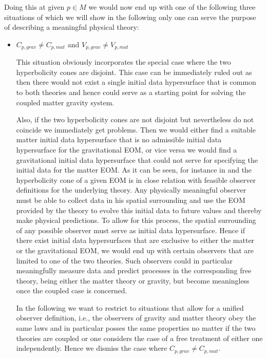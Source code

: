Doing this at given $p \in M$ we would now end up with one of the following three situations of which we will show in the following only one can serve the purpose of describing a meaningful physical theory:
\begin{itemize}
    \item $C_{p,grav} \neq C_{p,mat}$ and $V_{p,grav} \neq V_{p,mat}$
    
This situation obviously incorporates the special case where the two hyperbolicity cones are disjoint. This case can be immediately ruled out as then there would not exist a single initial data hypersurface that is common to both theories and hence could serve as a starting point for solving the coupled matter gravity system.   

Also, if the two hyperbolicity cones are not disjoint but nevertheless do not coincide we immediately get problems. Then we would either find a suitable matter initial data hypersurface that is no admissible initial data hypersurface for the gravitational EOM, or vice versa we would find a gravitational initial data hypersurface that could not serve for specifying the initial data for the matter EOM. As it can be seen, for instance in \cite{Rivera} and \cite{2011PhRvD..83d4047R} the hyperbolicity cone of a given EOM is in close relation with feasible observer definitions for the underlying theory. Any physically meaningful observer must be able to collect data in his spatial surrounding and use the EOM provided by the theory to evolve this initial data to future values and thereby make physical predictions. To allow for this process, the spatial surrounding of any possible observer must serve as initial data hypersurface. Hence if there exist initial data hypersurfaces that are exclusive to either the matter or the gravitational EOM, we would end up with certain observers that are limited to one of the two theories. Such observers could in particular meaningfully measure data and predict processes in the corresponding free theory, being either the matter theory or gravity, but become meaningless once the coupled case is concerned.

In the following we want to restrict to situations that allow for a unified observer definition, i.e., the observers of gravity and matter theory obey the same laws and in particular posses the same properties no matter if the two theories are coupled or one considers the case of a free treatment of either one independently. Hence we dismiss the case where $C_{p,grav} \neq C_{p,mat}$.


\end{itemize}
